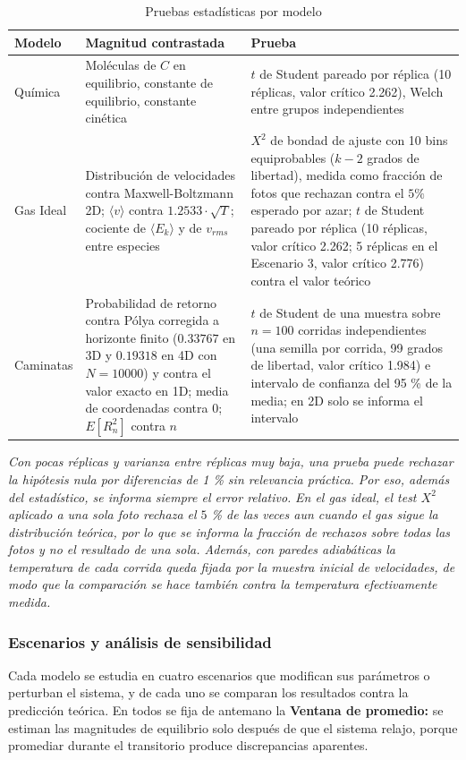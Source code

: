 \documentclass{article}
\begin{document}
\begin{table}[h]
\centering
\renewcommand{\arraystretch}{1.3} 
\caption{Pruebas estadísticas por modelo}
\begin{tabularx}{\textwidth}{| >{\centering\arraybackslash}p{2.2cm} | Y | Y |}
    \hline
    \textbf{Modelo} & \textbf{Magnitud contrastada} & \textbf{Prueba} \\
    \hline
    Química & Moléculas de $C$ en equilibrio, constante de equilibrio, constante cinética & $t$ de Student pareado por réplica (10 réplicas, valor crítico 2.262), Welch entre grupos independientes \\
    \hline
    Gas Ideal & Distribución de velocidades contra Maxwell-Boltzmann 2D; $\langle v\rangle$ contra $1.2533\cdot \sqrt{T}$; cociente de $\langle E_k\rangle$ y de $v_{rms}$ entre especies & $X^2$ de bondad de ajuste con 10 bins equiprobables ($k-2$ grados de libertad), medida como fracción de fotos que rechazan contra el $5 \%$ esperado por azar; $t$ de Student pareado por réplica (10 réplicas, valor crítico 2.262; 5 réplicas en el Escenario 3, valor crítico 2.776) contra el valor teórico \\
    \hline
    Caminatas & Probabilidad de retorno contra Pólya corregida a horizonte finito ($0.33767$ en 3D y $0.19318$ en 4D con $N=10000$) y contra el valor exacto en 1D; media de coordenadas contra 0; $E[R_n^2]$ contra $n$ & $t$ de Student de una muestra sobre $n=100$ corridas independientes (una semilla por corrida, 99 grados de libertad, valor crítico 1.984) e intervalo de confianza del 95 \% de la media; en 2D solo se informa el intervalo \\
    \hline
\end{tabularx}
\end{table}
\textit{Con pocas réplicas y varianza entre réplicas muy baja, una prueba puede rechazar la hipótesis nula por diferencias de 1 \% sin relevancia práctica. Por eso, además del estadístico, se informa siempre el error relativo.}
\textit{En el gas ideal, el test $X^2$ aplicado a una sola foto rechaza el $5$ \% de las veces aun cuando el gas sigue la distribución teórica, por lo que se informa la fracción de rechazos sobre todas las fotos y no el resultado de una sola. Además, con paredes adiabáticas la temperatura de cada corrida queda fijada por la muestra inicial de velocidades, de modo que la comparación se hace también contra la temperatura efectivamente medida.}
\subsubsection{Escenarios y análisis de sensibilidad}
Cada modelo se estudia en cuatro escenarios que modifican sus parámetros o perturban el sistema, y de cada uno se comparan los resultados contra la predicción teórica. En todos se fija de antemano la \textbf{Ventana de promedio:} se estiman las magnitudes de equilibrio solo después de que el sistema relajo, porque promediar durante el transitorio produce discrepancias aparentes.
\end{document}
